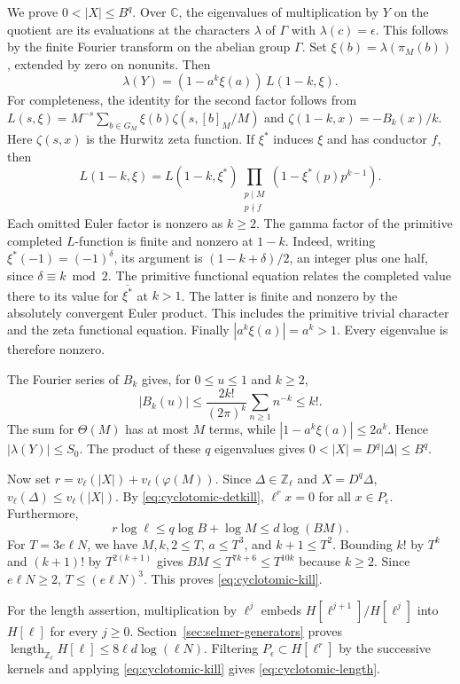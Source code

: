 We prove \(0<|X|\le B^q\).
Over \(\mathbb C\), the eigenvalues of multiplication by \(Y\) on
the quotient are its evaluations at the characters \(\lambda\) of
\(\Gamma\) with \(\lambda(c)=\epsilon\). This follows by the
finite Fourier transform on the abelian group \(\Gamma\).
Set \(\xi(b)=\lambda(\pi_M(b))\), extended by zero on nonunits.
Then
\[
 \lambda(Y)=(1-a^k\xi(a))\,L(1-k,\xi).
\]
For completeness, the identity for the second factor follows from
\(L(s,\xi)=M^{-s}\sum_{b\in G_M}\xi(b)\zeta(s,[b]_M/M)\) and
\(\zeta(1-k,x)=-B_k(x)/k\). Here \(\zeta(s,x)\) is the Hurwitz
zeta function. If \(\xi^*\) induces \(\xi\) and has conductor \(f\),
then
\[
 L(1-k,\xi)=L(1-k,\xi^*)
   \prod_{\substack{p\mid M\\p\nmid f}}(1-\xi^*(p)p^{k-1}).
\]
Each omitted Euler factor is nonzero as \(k\ge2\). The gamma factor
of the primitive completed \(L\)-function is finite and nonzero at
\(1-k\). Indeed, writing \(\xi^*(-1)=(-1)^\delta\), its argument is
\((1-k+\delta)/2\), an integer plus one half, since
\(\delta\equiv k\bmod 2\). The primitive functional equation
relates the completed value there to its value for
\(\overline{\xi^*}\) at \(k>1\). The latter is finite and nonzero
by the absolutely convergent Euler product. This includes the
primitive trivial character and the zeta functional equation.
Finally \(|a^k\xi(a)|=a^k>1\). Every eigenvalue is therefore nonzero.

The Fourier series of \(B_k\) gives, for \(0\le u\le1\) and \(k\ge2\),
\[
 |B_k(u)|\le \frac{2k!}{(2\pi)^k}\sum_{n\ge1}n^{-k}\le k!.
\]
The sum for \(\Theta(M)\) has at most \(M\) terms, while
\(|1-a^k\xi(a)|\le2a^k\). Hence \(|\lambda(Y)|\le S_0\).
The product of these \(q\) eigenvalues gives
\(0<|X|=D^q|\Delta|\le B^q\).

Now set \(r=v_\ell(|X|)+v_\ell(\varphi(M))\).
Since \(\Delta\in\mathbb Z_\ell\) and \(X=D^q\Delta\),
\(v_\ell(\Delta)\le v_\ell(|X|)\). By
\eqref{eq:cyclotomic-detkill}, \(\ell^r x=0\) for all
\(x\in P_\epsilon\). Furthermore,
\[
 r\log\ell \le q\log B+\log M
                  \le d\log(BM).
\]
For \(T=3e\ell N\), we have \(M,k,2\le T\), \(a\le T^3\), and
\(k+1\le T^2\). Bounding \(k!\) by \(T^k\) and \((k+1)!\) by
\(T^{2(k+1)}\) gives \(BM\le T^{7k+6}\le T^{10k}\) because
\(k\ge2\). Since \(e\ell N\ge2\), \(T\le(e\ell N)^3\).
This proves \eqref{eq:cyclotomic-kill}.

For the length assertion, multiplication by \(\ell^j\) embeds
\(H[\ell^{j+1}]/H[\ell^j]\) into \(H[\ell]\) for every \(j\ge0\).
Section~\ref{sec:selmer-generators} proves
\(\operatorname{length}_{\mathbb Z_\ell}H[\ell]\le
8\ell d\log(\ell N)\). Filtering \(P_\epsilon\subset H[\ell^r]\)
by the successive kernels and applying \eqref{eq:cyclotomic-kill}
gives \eqref{eq:cyclotomic-length}.

